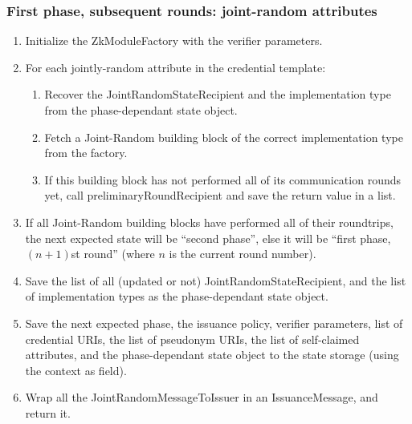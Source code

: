   \subsubsection{First phase, subsequent rounds: joint-random attributes}
  \notimplemented
  \begin{enumerate}
    \item Initialize the ZkModuleFactory with the verifier parameters.
    \item For each jointly-random attribute in the credential template:
      \begin{enumerate}
        \item Recover the JointRandomStateRecipient and the implementation type from the phase-dependant state object.
        \item Fetch a Joint-Random building block of the correct implementation type from the factory.
        \item If this building block has not performed all of its communication rounds yet, call preliminaryRoundRecipient and
          save the return value in a list.
      \end{enumerate}
      \item If all Joint-Random building blocks have performed all of their roundtrips, the next expected state will be ``second phase'', else
        it will be ``first phase, $(n+1)$st round'' (where $n$ is the current round number).
      \item Save the list of all (updated or not) JointRandomStateRecipient, and the list of implementation types as the phase-dependant state object.
      \item Save the next expected phase, the issuance policy, verifier parameters, list of credential URIs, the list of
        pseudonym URIs, the list of self-claimed attributes, and the phase-dependant state object to the state storage (using the context as field).
      \item Wrap all the JointRandomMessageToIssuer in an IssuanceMessage, and return it.
  \end{enumerate}

